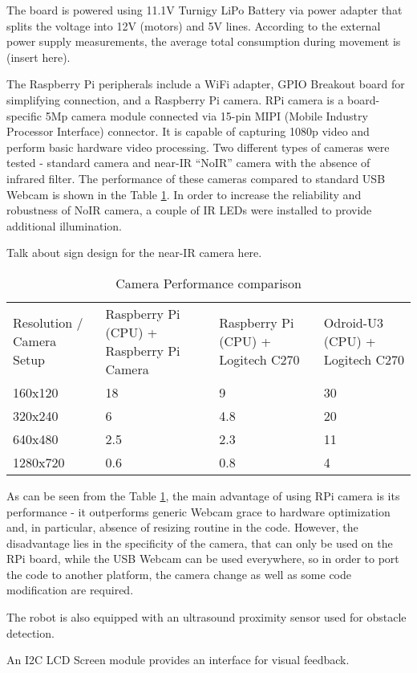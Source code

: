 The board is powered using 11.1V Turnigy LiPo Battery via power adapter that
splits the voltage into 12V (motors) and 5V lines. According to the external
power supply measurements, the average total consumption during movement is
(insert here).

The Raspberry Pi peripherals include a WiFi adapter, GPIO Breakout board for
simplifying connection, and a Raspberry Pi camera. RPi camera is a
board-specific 5Mp camera module connected via 15-pin MIPI (Mobile Industry
Processor Interface) connector. It is capable of capturing 1080p video and
perform basic hardware video processing. Two different types of cameras were
tested - standard camera and near-IR ``NoIR'' camera with the absence of
infrared filter. The performance of these cameras compared to standard USB
Webcam is shown in the Table \ref{tab:cam_perf}. In order to
increase the reliability and robustness of NoIR camera, a couple of IR LEDs were
installed to provide additional illumination.

Talk about sign design for the near-IR camera here.

\begin{table}[h!]
	\setlength\extrarowheight{2pt}
	\setlength\arraycolsep{5pt}
    \begin{tabularx}{\textwidth}{XXXX}
    Resolution / Camera Setup & Raspberry Pi  (CPU) + Raspberry Pi Camera &
    Raspberry Pi (CPU) + Logitech C270 & Odroid-U3 (CPU) + Logitech C270 \\
    160x120            & 18           & 9          & 30         \\
    320x240            & 6            & 4.8        & 20         \\
    640x480            & 2.5          & 2.3        & 11         \\
    1280x720           & 0.6          & 0.8        & 4          \\
    \end{tabularx}
    \caption{Camera Performance comparison}
    \label{tab:cam_perf}
\end{table}

As can be seen from the Table \ref{tab:cam_perf}, the main advantage of using
RPi camera is its performance - it outperforms generic Webcam grace to hardware
optimization and, in particular, absence of resizing routine in the code.
However, the disadvantage lies in the specificity of the camera, that can only
be used on the RPi board, while the USB Webcam can be used everywhere, so in
order to port the code to another platform, the camera change as well as some
code modification are required.

The robot is also equipped with an ultrasound proximity sensor used for obstacle
detection.

An I2C LCD Screen module provides an interface for visual feedback.
